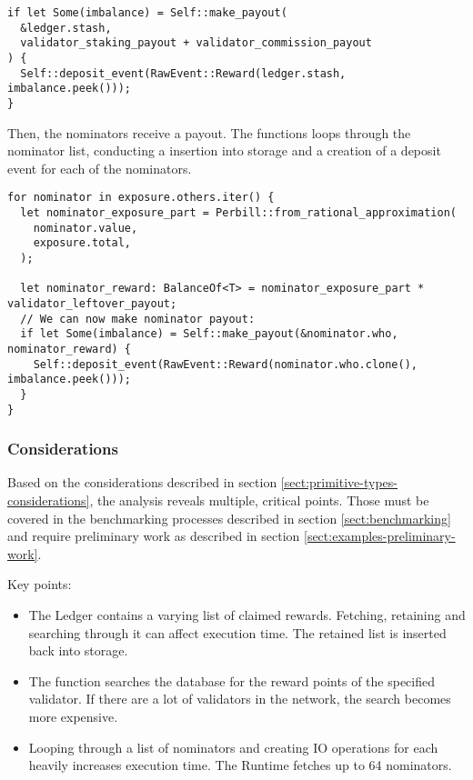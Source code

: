 \documentclass[11pt,a4paper]{article}
\begin{document}
\begin{verbatim}
if let Some(imbalance) = Self::make_payout(
  &ledger.stash,
  validator_staking_payout + validator_commission_payout
) {
  Self::deposit_event(RawEvent::Reward(ledger.stash, imbalance.peek()));
}
\end{verbatim}

Then, the nominators receive a payout. The functions loops through the nominator list, conducting
a insertion into storage and a creation of a deposit event for each of the nominators.

\begin{verbatim}
for nominator in exposure.others.iter() {
  let nominator_exposure_part = Perbill::from_rational_approximation(
    nominator.value,
    exposure.total,
  );

  let nominator_reward: BalanceOf<T> = nominator_exposure_part * validator_leftover_payout;
  // We can now make nominator payout:
  if let Some(imbalance) = Self::make_payout(&nominator.who, nominator_reward) {
    Self::deposit_event(RawEvent::Reward(nominator.who.clone(), imbalance.peek()));
  }
}
\end{verbatim}

\subsubsection*{Considerations}

Based on the considerations described in section \ref{sect:primitive-types-considerations},
the analysis reveals multiple, critical points. Those must be covered in the benchmarking
processes described in section \ref{sect:benchmarking} and require preliminary work as
described in section \ref{sect:examples-preliminary-work}.
\newline

Key points:

\begin{itemize}
  \item The Ledger contains a varying list of claimed rewards. Fetching, retaining and searching through it can affect execution
  time. The retained list is inserted back into storage.
  \item The function searches the database for the reward points of the specified validator. If there are a lot of validators
  in the network, the search becomes more expensive.
  \item Looping through a list of nominators and creating IO operations for each heavily increases execution time.
  The Runtime fetches up to 64 nominators.
\end{itemize}
\end{document}
